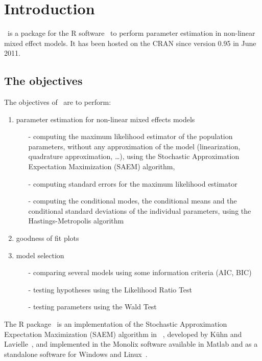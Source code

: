 \chapter{Introduction} \label{chapter_introduction}

\saemix~is a package for the {\sf R} software~\cite{R} to perform parameter estimation in non-linear mixed effect models. It has been hosted on the CRAN since version 0.95 in June 2011.

\section{The objectives}

The objectives of \saemix~are to perform:
\begin{enumerate}
\item parameter estimation for non-linear mixed effects models
\begin{itemize}
\item[-] computing the maximum likelihood estimator of the population parameters, without any approximation of the model (linearization, quadrature approximation, \ldots), using the Stochastic Approximation Expectation Maximization (SAEM) algorithm,
\item[-] computing standard errors for the maximum likelihood estimator
\item[-] computing the conditional modes, the conditional means and the conditional standard deviations of the individual parameters, using the Hastings-Metropolis algorithm
\end{itemize}
\item goodness of fit plots
\item model selection
\begin{itemize}
\item[-] comparing several models using some information criteria (AIC, BIC)
\item[-] testing hypotheses using the Likelihood Ratio Test
\item[-] testing parameters using the Wald Test
\end{itemize}
\end{enumerate}
The R package \saemix~is an implementation of the Stochastic Approximation Expectation Maximization (SAEM) algorithm in \R~\cite{R}, developed by K\"uhn and Lavielle~\cite{Kuhn05}, and implemented in the {\sc Monolix} software available in Matlab and as a standalone software for Windows and Linux~\cite{LavielleMonolix}.

